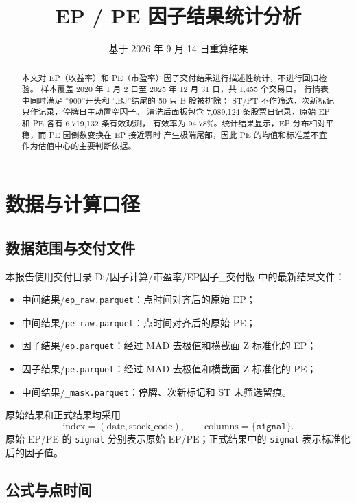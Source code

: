 \documentclass[UTF8,a4paper,11pt]{ctexart}
\title{\textbf{EP / PE 因子结果统计分析}}
\author{基于 2026 年 9 月 14 日重算结果}
\date{}
\newcommand{\filepath}[2]{\textnormal{#1/}\texttt{#2}}
\begin{document}
\maketitle

\begin{abstract}
本文对 EP（收益率）和 PE（市盈率）因子交付结果进行描述性统计，不进行回归检验。
样本覆盖 2020 年 1 月 2 日至 2025 年 12 月 31 日，共 1,455 个交易日。
行情表中同时满足 \textquotedblleft 900\textquotedblright 开头和
\textquotedblleft .BJ\textquotedblright 结尾的 50 只 B 股被排除；
ST/PT 不作筛选，次新标记只作记录，停牌日主动置空因子。
清洗后面板包含 7,089,124 条股票日记录，原始 EP 和 PE 各有 6,719,132 条有效观测，
有效率为 94.78\%。统计结果显示，EP 分布相对平稳，而 PE 因倒数变换在 EP 接近零时
产生极端尾部，因此 PE 的均值和标准差不宜作为估值中心的主要判断依据。
\end{abstract}

\section{数据与计算口径}

\subsection{数据范围与交付文件}

本报告使用交付目录
\textnormal{D:/因子计算/市盈率/EP因子\_交付版} 中的最新结果文件：

\begin{itemize}[leftmargin=2.5em]
  \item \filepath{中间结果}{ep\_raw.parquet}：点时间对齐后的原始 EP；
  \item \filepath{中间结果}{pe\_raw.parquet}：点时间对齐后的原始 PE；
  \item \filepath{因子结果}{ep.parquet}：经过 MAD 去极值和横截面 Z 标准化的 EP；
  \item \filepath{因子结果}{pe.parquet}：经过 MAD 去极值和横截面 Z 标准化的 PE；
  \item \filepath{中间结果}{\_mask.parquet}：停牌、次新标记和 ST 未筛选留痕。
\end{itemize}

原始结果和正式结果均采用
\[
  \text{index}=(\text{date},\text{stock\_code}),\qquad
  \text{columns}=\{\texttt{signal}\}.
\]
原始 EP/PE 的 \texttt{signal} 分别表示原始 EP/PE；正式结果中的
\texttt{signal} 表示标准化后的因子值。

\subsection{公式与点时间}
\end{document}
